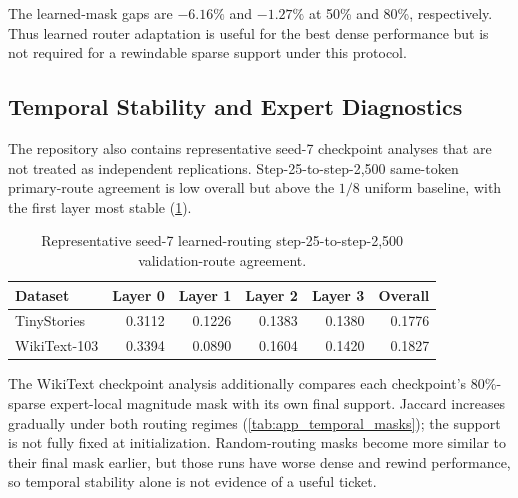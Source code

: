 \documentclass{article}
\begin{document}
\begin{table}[t]
\centering
\scriptsize
\caption{Fixed-random-router full-budget retraining at the 10\% rewind, mean
$\pm$ population SD over three seeds.}
\label{tab:app_fixed_router_rewind}
\end{table}

The learned-mask gaps are $-6.16\%$ and $-1.27\%$ at 50\% and 80\%,
respectively. Thus learned router adaptation is useful
for the best dense performance but is not required for a rewindable sparse
support under this protocol.

\subsection{Temporal Stability and Expert Diagnostics}

The repository also contains representative seed-7 checkpoint analyses that
are not treated as independent replications. Step-25-to-step-2,500 same-token
primary-route agreement is low overall but above the $1/8$ uniform baseline,
with the first layer most stable (\cref{tab:app_temporal_routes}).

\begin{table}[t]
\centering
\scriptsize
\caption{Representative seed-7 learned-routing step-25-to-step-2,500
validation-route agreement.}
\label{tab:app_temporal_routes}
\begin{tabular}{@{}lrrrrr@{}}
\toprule
Dataset & Layer 0 & Layer 1 & Layer 2 & Layer 3 & Overall \\
\midrule
TinyStories & 0.3112 & 0.1226 & 0.1383 & 0.1380 & 0.1776 \\
WikiText-103 & 0.3394 & 0.0890 & 0.1604 & 0.1420 & 0.1827 \\
\bottomrule
\end{tabular}
\end{table}

The WikiText checkpoint analysis additionally compares each checkpoint's
80\%-sparse expert-local magnitude mask with its own final support. Jaccard
increases gradually under both routing regimes (\cref{tab:app_temporal_masks});
the support is not fully fixed at initialization. Random-routing masks become
more similar to their final mask earlier, but those runs have worse dense and
rewind performance, so temporal stability alone is not evidence of a useful
ticket.
\end{document}

